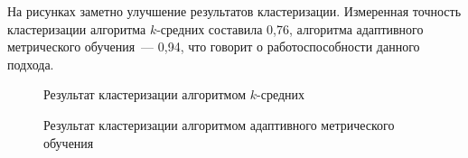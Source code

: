\documentclass[12pt,twoside]{article}
\begin{document}
На рисунках заметно улучшение результатов кластеризации.
Измеренная точность кластеризации алгоритма $k$-средних составила 0,76,
алгоритма адаптивного метрического обучения~--- 0,94, что говорит о работоспособности данного подхода.
\begin{figure} %
    \caption{Результат кластеризации алгоритмом $k$-средних}
\end{figure}
\begin{figure} %
    \caption{Результат кластеризации алгоритмом адаптивного метрического обучения}
\end{figure}
\end{document}
